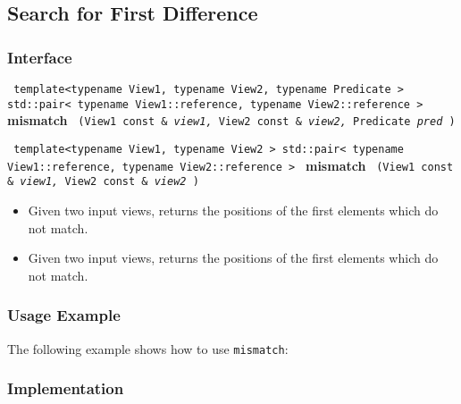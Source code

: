  
\subsection{Search for First Difference} \label{sec-srch-mismatch}

\subsubsection{Interface} %

\noindent
\texttt{%
template<typename View1, typename View2, typename Predicate >
\newline
std::pair< typename View1::reference, typename View2::reference > 
}
\newline
\textbf{mismatch}%
\texttt{%
(View1 const \&
\textit{view1,}%
View2 const \&
\textit{view2,}%
Predicate 
\textit{pred}%
)
}
\vspace{0.4cm}
 
\noindent
\texttt{%
template<typename View1, typename View2 >
\newline
std::pair< typename View1::reference, typename View2::reference > 
}
\newline
\textbf{mismatch}%
\texttt{%
(View1 const \&
\textit{view1,}%
View2 const \&
\textit{view2}%
)
}

\begin{itemize}
\item
Given two input views, returns the positions of the first elements which do not match. 
\item
Given two input views, returns the positions of the first elements which do not match. 
\end{itemize}

\subsubsection{Usage Example} %

The following example shows how to use \texttt{mismatch}:


\subsubsection{Implementation} %

